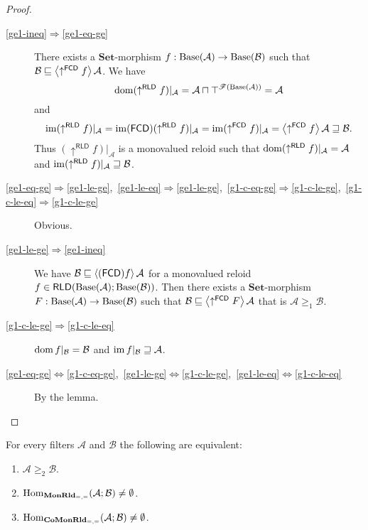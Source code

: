 \begin{proof}
~
\begin{description}
\item [{\ref{ge1-ineq}$\Rightarrow$\ref{ge1-eq-ge}}] There exists a
$\mathbf{Set}$-morphism $f:\operatorname{Base}(\mathcal{A})\rightarrow\operatorname{Base}(\mathcal{B})$
such that $\mathcal{B}\sqsubseteq\left\langle \uparrow^{\mathsf{FCD}}f\right\rangle\mathcal{A}$.
We have
\[
\operatorname{dom}(\uparrow^{\mathsf{RLD}}f)|_{\mathcal{A}}=\mathcal{A}\sqcap\top^{\mathscr{F}(\operatorname{Base}(\mathcal{A}))}=\mathcal{A}
\]
and
\[
\operatorname{im}(\uparrow^{\mathsf{RLD}}f)|_{\mathcal{A}}=\operatorname{im}(\mathsf{FCD})(\uparrow^{\mathsf{RLD}}f)|_{\mathcal{A}}=\operatorname{im}(\uparrow^{\mathsf{FCD}}f)|_{\mathcal{A}}=\left\langle \uparrow^{\mathsf{FCD}}f\right\rangle\mathcal{A}\sqsupseteq\mathcal{B}.
\]
Thus $(\uparrow^{\mathsf{RLD}}f)|_{\mathcal{A}}$ is a monovalued
reloid such that $\operatorname{dom}(\uparrow^{\mathsf{RLD}}f)|_{\mathcal{A}}=\mathcal{A}$
and $\operatorname{im}(\uparrow^{\mathsf{RLD}}f)|_{\mathcal{A}}\sqsupseteq\mathcal{B}$.
\item [{\ref{ge1-eq-ge}$\Rightarrow$\ref{ge1-le-ge},~\ref{ge1-le-eq}$\Rightarrow$\ref{ge1-le-ge},~\ref{g1-c-eq-ge}$\Rightarrow$\ref{g1-c-le-ge},~\ref{g1-c-le-eq}$\Rightarrow$\ref{g1-c-le-ge}}] Obvious.
\item [{\ref{ge1-le-ge}$\Rightarrow$\ref{ge1-ineq}}] We have $\mathcal{B}\sqsubseteq\left\langle (\mathsf{FCD}) f\right\rangle\mathcal{A}$
for a monovalued reloid $f\in\mathsf{RLD}(\operatorname{Base}(\mathcal{A});\operatorname{Base}(\mathcal{B}))$.
Then there exists a $\mathbf{Set}$-morphism $F:\operatorname{Base}(\mathcal{A})\rightarrow\operatorname{Base}(\mathcal{B})$
such that $\mathcal{B}\sqsubseteq\left\langle \uparrow^{\mathsf{FCD}}F\right\rangle\mathcal{A}$
that is $\mathcal{A}\ge_{1}\mathcal{B}$.
\item [{\ref{g1-c-le-ge}$\Rightarrow$\ref{g1-c-le-eq}}] $\operatorname{dom} f|_{\mathcal{B}}=\mathcal{B}$
and $\operatorname{im} f|_{\mathcal{B}}\sqsupseteq\mathcal{A}$.
\item [{\ref{ge1-eq-ge}$\Leftrightarrow$\ref{g1-c-eq-ge},~\ref{ge1-le-ge}$\Leftrightarrow$\ref{g1-c-le-ge},~\ref{ge1-le-eq}$\Leftrightarrow$\ref{g1-c-le-eq}}] By
the lemma.
\end{description}
\end{proof}
\begin{thm}
For every filters $\mathcal{A}$ and $\mathcal{B}$ the following
are equivalent:
\begin{enumerate}
\item \label{ge2-in}$\mathcal{A}\ge_{2}\mathcal{B}$.
\item \label{ge2-mon}$\operatorname{Hom}_{\mathbf{MonRld}_{=,=}}(\mathcal{A};\mathcal{B})\ne\emptyset$.
\item \label{ge2-comon}$\operatorname{Hom}_{\mathbf{CoMonRld}_{=,=}}(\mathcal{A};\mathcal{B})\ne\emptyset$.
\end{enumerate}
\end{thm}
